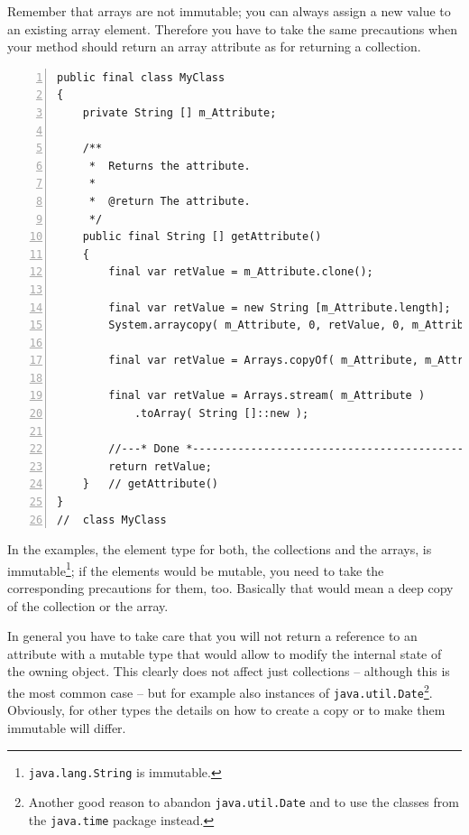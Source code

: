 \documentclass[11pt,a4paper, titlepage, parskip=half, headsepline, footsepline, cleardoublepage=current, headheight=1cm]{scrbook}
\begin{document}
Remember that arrays are not immutable; you can always assign a new value to an existing array element. Therefore you have to take the same precautions when your method should return an array attribute as for returning a collection.
\begin{lstlisting}[numbers=left]
public final class MyClass
{
    private String [] m_Attribute;

    /**
     *  Returns the attribute.
     * 
     *  @return The attribute.
     */ 
    public final String [] getAttribute()
    {
        final var retValue = m_Attribute.clone();

        final var retValue = new String [m_Attribute.length];
        System.arraycopy( m_Attribute, 0, retValue, 0, m_Attribute.length );

        final var retValue = Arrays.copyOf( m_Attribute, m_Attribute.length );

        final var retValue = Arrays.stream( m_Attribute )
            .toArray( String []::new );

        //---* Done *------------------------------------------------
        return retValue;
    }   // getAttribute()
}
//  class MyClass    
\end{lstlisting}

In the examples, the element type for both, the collections and the arrays, is immutable\footnote{\lstinline|java.lang.String| is immutable.}; if the elements would be mutable, you need to take the corresponding precautions for them, too. Basically that would mean a deep copy of the collection or the array.

In general you have to take care that you will not return a reference to an attribute with a mutable type that would allow to modify the internal state of the owning object. This clearly does not affect just collections – although this is the most common case – but for example also instances of \lstinline|java.util.Date|\autocite{ORACLE_DOC_DATE_CLASS}\footnote{Another good reason to abandon \lstinline|java.util.Date| and to use the classes from the \lstinline|java.time|\autocite{ORACLE_DOC_TIME_PACKAGE} package instead.}. Obviously, for other types the details on how to create a copy or to make them immutable will differ.
\end{document}
